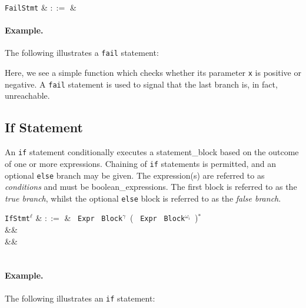\begin{syntax}
  \verb+FailStmt+ & $::=$ & \\
\end{syntax}

\paragraph{Example.} The following illustrates a \lstinline{fail} statement:



Here, we see a simple function which checks whether its parameter \lstinline{x} is positive or negative.  A \lstinline{fail} statement is used to signal that the last branch is, in fact, unreachable. 




\subsection{If Statement}
\label{c_stmts_if}
An \lstinline{if} statement conditionally executes a \gls{statement_block} based on the outcome of one or more expressions.  Chaining of \lstinline{if} statements is permitted, and an optional \lstinline{else} branch may be given.  The expression(s) are referred to as {\em conditions} and must be \gls{boolean_expression}s.  The first block is referred to as the {\em true branch}, whilst the optional \lstinline{else} block is referred to as the {\em false branch}.

\begin{syntax}
  \verb+IfStmt+$^\ell$ & $::=$ & \ \verb+Expr+\ \token{:}
  \verb+Block+$^\gamma$\ \big(  \ \verb+Expr+\ \token{:}
  \verb+Block+$^{\omega_i}$\ \big)$^*$ \\
&& \\
&&\\
\\
\end{syntax}

\paragraph{Example.} The following illustrates an \lstinline{if} statement:

